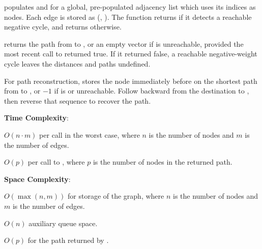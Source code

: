 \begin{compactitem}
  \item {} populates  and  for a global, pre-populated adjacency list  which uses its indices as nodes. Each edge is stored as (, ). The function returns  if it detects a reachable negative cycle, and returns  otherwise.
  \item {} returns the path from  to , or an empty vector if  is unreachable, provided the most recent call to  returned true. If it returned false, a reachable negative-weight cycle leaves the distances and paths undefined.
\end{compactitem}

For path reconstruction,  stores the node immediately before  on the shortest path from  to , or $-1$ if  is  or unreachable. Follow  backward from the destination to , then reverse that sequence to recover the path.

\textbf{Time Complexity}:
\begin{compactitem}
  \item $O(n \cdot m)$ per call in the worst case, where $n$ is the number of nodes and $m$ is the number of edges.
  \item $O(p)$ per call to , where $p$ is the number of nodes in the returned path.
\end{compactitem}

\textbf{Space Complexity}:
\begin{compactitem}
  \item $O(\max\left(n, m\right))$ for storage of the graph, where $n$ is the number of nodes and $m$ is the number of edges.
  \item $O(n)$ auxiliary queue space.
  \item $O(p)$ for the path returned by .
\end{compactitem}

